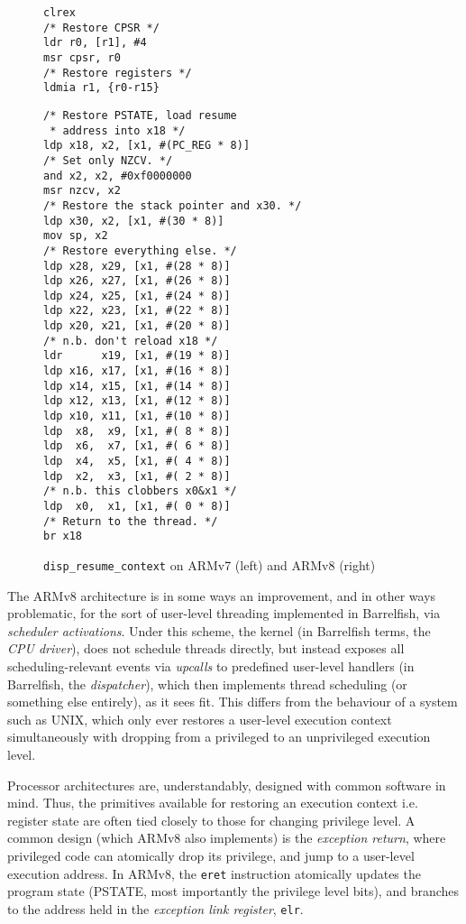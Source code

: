 \documentclass[a4paper,twoside]{report}
\begin{document}
\begin{figure}
\begin{center}
\begin{minipage}[t]{0.49\textwidth}
\begin{lstlisting}
clrex
/* Restore CPSR */
ldr r0, [r1], #4
msr cpsr, r0
/* Restore registers */
ldmia r1, {r0-r15}
\end{lstlisting}
\end{minipage}
\hfill
\begin{minipage}[t]{0.49\textwidth}
\begin{lstlisting}
/* Restore PSTATE, load resume
 * address into x18 */
ldp x18, x2, [x1, #(PC_REG * 8)]
/* Set only NZCV. */
and x2, x2, #0xf0000000
msr nzcv, x2
/* Restore the stack pointer and x30. */
ldp x30, x2, [x1, #(30 * 8)]
mov sp, x2
/* Restore everything else. */
ldp x28, x29, [x1, #(28 * 8)]
ldp x26, x27, [x1, #(26 * 8)]
ldp x24, x25, [x1, #(24 * 8)]
ldp x22, x23, [x1, #(22 * 8)]
ldp x20, x21, [x1, #(20 * 8)]
/* n.b. don't reload x18 */
ldr      x19, [x1, #(19 * 8)]
ldp x16, x17, [x1, #(16 * 8)]
ldp x14, x15, [x1, #(14 * 8)]
ldp x12, x13, [x1, #(12 * 8)]
ldp x10, x11, [x1, #(10 * 8)]
ldp  x8,  x9, [x1, #( 8 * 8)]
ldp  x6,  x7, [x1, #( 6 * 8)]
ldp  x4,  x5, [x1, #( 4 * 8)]
ldp  x2,  x3, [x1, #( 2 * 8)]
/* n.b. this clobbers x0&x1 */
ldp  x0,  x1, [x1, #( 0 * 8)]
/* Return to the thread. */
br x18
\end{lstlisting}
\end{minipage}
\end{center}
\caption{\texttt{disp\_resume\_context} on ARMv7 (left) and ARMv8 (right)}
\label{f:disp_resume}
\end{figure}

The ARMv8 architecture is in some ways an improvement, and in other ways
problematic, for the sort of user-level threading implemented in Barrelfish,
via \emph{scheduler activations}. Under this scheme, the kernel (in Barrelfish
terms, the \emph{CPU driver}), does not schedule threads directly, but instead
exposes all scheduling-relevant events via \emph{upcalls} to predefined
user-level handlers (in Barrelfish, the \emph{dispatcher}), which then
implements thread scheduling (or something else entirely), as it sees fit.
This differs from the behaviour of a system such as UNIX, which only ever
restores a user-level execution context simultaneously with dropping from a
privileged to an unprivileged execution level.

Processor architectures are, understandably, designed with common software in
mind. Thus, the primitives available for restoring an execution context i.e.
register state are often tied closely to those for changing privilege level. A
common design (which ARMv8 also implements) is the \emph{exception return},
where privileged code can atomically drop its privilege, and jump to a
user-level execution address. In ARMv8, the \texttt{eret} instruction
atomically updates the program state (PSTATE, most importantly the privilege
level bits), and branches to the address held in the \emph{exception link
register}, \texttt{elr}.
\end{document}
